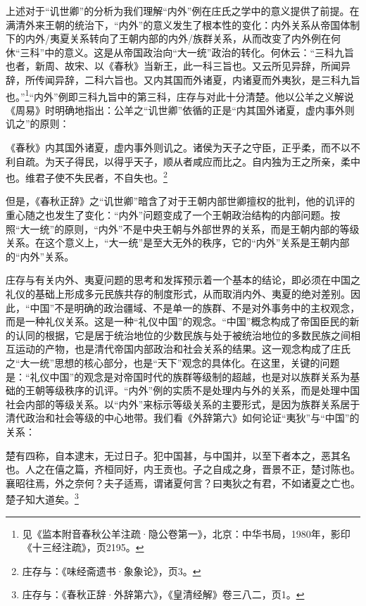 \documentclass[a4paper, 12pt, openright]{ctexbook}
\renewenvironment{quote}
  {\list{}{\rightmargin2\ccwd \leftmargin2\ccwd \itemindent=2\ccwd \listparindent=2\ccwd}%
   \item\relax\small\kaishu\color{black}}
  {\endlist}
\begin{document}
上述对于“讥世卿”的分析为我们理解“内外”例在庄氏之学中的意义提供了前提。在满清外来王朝的统治下，“内外”的意义发生了根本性的变化：内外关系从帝国体制下的内外/夷夏关系转向了王朝内部的内外/族群关系，从而改变了内外例在何休“三科”中的意义。这是从帝国政治向“大一统”政治的转化。何休云：“三科九旨也者，新周、故宋、以《春秋》当新王，此一科三旨也。又云所见异辞，所闻异辞，所传闻异辞，二科六旨也。又内其国而外诸夏，内诸夏而外夷狄，是三科九旨也。”\footnote{见《监本附音春秋公羊注疏·隐公卷第一》，北京：中华书局，1980年，影印《十三经注疏》，页2195。}“内外”例即三科九旨中的第三科，庄存与对此十分清楚。他以公羊之义解说《周易》时明确地指出：公羊之“讥世卿”依循的正是“内其国外诸夏，虚内事外则讥之”的原则：

\begin{quote}
《春秋》内其国外诸夏，虚内事外则讥之。诸侯为天子之守臣，正乎柔，而不以不利自疏。为天子得民，以得乎天子，顺从者咸应而比之。自内独为王之所亲，柔中也。维君子使不失民者，不自失也。\footnote{庄存与：《味经斋遗书·象象论》，页3。}
\end{quote}

但是，《春秋正辞》之“讥世卿”暗含了对于王朝内部世卿擅权的批判，他的讥评的重心随之也发生了变化：“内外”问题变成了一个王朝政治结构的内部问题。按照“大一统”的原则，“内外”不是中央王朝与外部世界的关系，而是王朝内部的等级关系。在这个意义上，“大一统”是至大无外的秩序，它的“内外”关系是王朝内部的“内外”关系。

庄存与有关内外、夷夏问题的思考和发挥预示着一个基本的结论，即必须在中国之礼仪的基础上形成多元民族共存的制度形式，从而取消内外、夷夏的绝对差别。因此，“中国”不是明确的政治疆域、不是单一的族群、不是对外事务中的主权观念，而是一种礼仪关系。这是一种“礼仪中国”的观念。“中国”概念构成了帝国臣民的新的认同的根据，它是居于统治地位的少数民族与处于被统治地位的多数民族之间相互运动的产物，也是清代帝国内部政治和社会关系的结果。这一观念构成了庄氏之“大一统”思想的核心部分，也是“天下”观念的具体化。在这里，关键的问题是：“礼仪中国”的观念是对帝国时代的族群等级制的超越，也是对以族群关系为基础的王朝等级秩序的讥评。“内外”例的实质不是处理内与外的关系，而是处理中国社会内部的等级关系。以“内外”来标示等级关系的主要形式，是因为族群关系居于清代政治和社会等级的中心地带。我们看《外辞第六》如何论证“夷狄”与“中国”的关系：

\begin{quote}
楚有四称，自本逮末，无过日子。犯中国甚，与中国并，以至下者本之，恶其名也。人之在僖之篇，齐桓同好，内王贡也。子之自成之身，晋景不正，楚讨陈也。襄昭往焉，外之奈何？夫子适焉，谓诸夏何言？曰夷狄之有君，不如诸夏之亡也。楚子知大道矣。\footnote{庄存与：《春秋正辞·外辞第六》，《皇清经解》卷三八二，页1。}
\end{quote}
\end{document}
